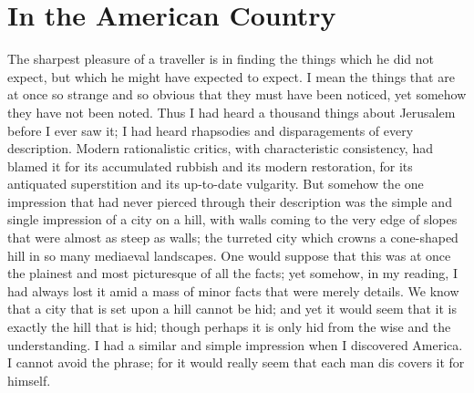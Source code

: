 \documentclass{book}
\begin{document}
\chapter{In the American Country}
\label{chapter-5}
The sharpest pleasure of a traveller is in finding the things which he did not expect, but which he might have expected to expect. I mean the things that are at once so strange and so obvious that they must have been noticed, yet somehow they have not been noted. Thus I had heard a thousand things about Jerusalem before I ever saw it; I had heard rhapsodies and disparagements of every description. Modern rationalistic critics, with characteristic consistency, had blamed it for its accumulated rubbish and its modern restoration, for its antiquated superstition and its up-to-date vulgarity. But somehow the one impression that had never pierced through their description was the simple and single impression of a city on a hill, with walls coming to the very edge of slopes that were almost as steep as walls; the turreted city which crowns a cone-shaped hill in so many mediaeval landscapes. One would suppose that this was at once the plainest and most picturesque of all the facts; yet somehow, in my reading, I had always lost it amid a mass of minor facts that were merely details. We know that a city that is set upon a hill cannot be hid; and yet it would seem that it is exactly the hill that is hid; though perhaps it is only hid from the wise and the understanding. I had a similar and simple impression when I discovered America. I cannot avoid the phrase; for it would really seem that each man dis covers it for himself.
\end{document}
